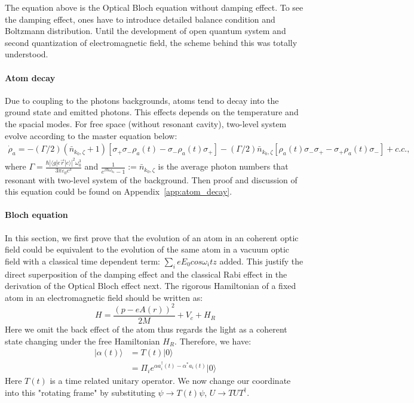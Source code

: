 \documentclass[11pt]{article}
\begin{document}
The equation above is the Optical Bloch equation without damping effect. 
To see the damping effect, ones have to  introduce detailed balance condition and Boltzmann distribution. 
Until the development of open quantum system and second quantization of electromagnetic field, the scheme behind this was totally understood.

\paragraph{Atom decay}
 Due to coupling to the photons backgrounds, atoms tend to decay into the ground state and emitted photons. This effects depends on the temperature and the spacial modes.  For free space (without resonant cavity), two-level system evolve according to the master equation below:
\begin{align}
\dot\rho_{a} =-(\Gamma/2)   ( \bar{n}_{k_0,\zeta}+1) [\sigma_{+}\sigma_{-}\rho_a(t) -  \sigma_{-}\rho_a(t)\sigma_{+} ]- (\Gamma/2)  \bar{n}_{k_0,\zeta}[\rho_a(t)\sigma_{-}\sigma_{+} -\sigma_{+}\rho_a(t)\sigma_{-} ]+ c.c.,
\end{align}
where $\Gamma = \frac{\hbar |\langle g|e\vec{r}|e\rangle|^2\omega_0^3 }{3 \pi \varepsilon_0 c^3} $ and $\frac{1}{e^{\beta\hbar\omega_{k_0}} - 1} :=  \bar{n}_{k_0,\zeta}$ is the average photon numbers that resonant with two-level system of the background. Then proof and discussion of this equation could be found on Appendix~\ref{app:atom_decay}.

\paragraph{Bloch equation} 
In this section, we first prove that the evolution of an atom in an coherent optic field could be equivalent to the evolution of the same atom in a vacuum optic field with a classical time dependent term: $\sum_i e E_0 cos\omega_i t z $ added. 
This justify the direct superposition of the damping effect and the classical Rabi effect in the derivation of the Optical Bloch effect next.
The rigorous Hamiltonian of a fixed atom in an electromagnetic field should be written as:
$$
H = \frac{(p - eA(r))^2}{2M} + V_{c} +H_{R} 
$$
Here we omit the back effect of the atom thus regards the light as a coherent state changing under the free Hamiltonian $H_R$. 
Therefore, we have:
\begin{align*}
    |\alpha(t) \rangle &= T(t) |0\rangle \\
    &= \Pi_i e^{\alpha a_i^\dagger(t) -  \alpha^* a_i(t)} |0 \rangle
\end{align*}
Here $T(t)$ is a time related unitary operator. We now change our coordinate into this "rotating frame" by substituting $\psi \to T(t)\psi$, $U \to TUT^\dagger$. 
\end{document}
